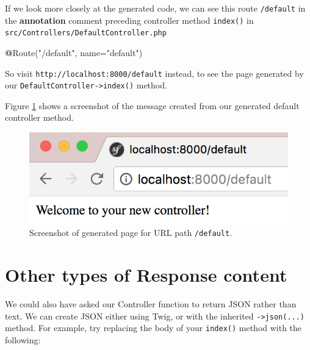\documentclass[a4paperpaper,openright]{book}
\newenvironment{Shaded}{}{}
\newcommand{\ErrorTok}[1]{\textcolor[rgb]{1.00,0.00,0.00}{\textbf{#1}}}
\newcommand{\KeywordTok}[1]{\textcolor[rgb]{0.00,0.44,0.13}{\textbf{#1}}}
\newcommand{\NormalTok}[1]{#1}
\newcommand{\OtherTok}[1]{\textcolor[rgb]{0.00,0.44,0.13}{#1}}
\newcommand{\StringTok}[1]{\textcolor[rgb]{0.25,0.44,0.63}{#1}}
\begin{document}
If we look more closely at the generated code, we can see this route
\texttt{/default} in the \textbf{annotation} comment preceding
controller method \texttt{index()} in
\texttt{src/Controllers/DefaultController.php}

\begin{Shaded}
\begin{Highlighting}[]
    \ErrorTok{@}\NormalTok{Route}\OtherTok{(}\StringTok{"/default"}\OtherTok{,}\NormalTok{ name=}\StringTok{"default"}\OtherTok{)}
\end{Highlighting}
\end{Shaded}

So visit \texttt{http://localhost:8000/default} instead, to see the page
generated by our \texttt{DefaultController-\textgreater{}index()}
method.

Figure \ref{generated_default} shows a screenshot of the message created
from our generated default controller method.

\begin{figure}
\centering
\includegraphics{./tex2pdf.-65f13e14688ab55b/1ed3d02a50a2750e79c73555fde09e2b4117bd0f.png}
\caption{Screenshot of generated page for URL path \texttt{/default}.
\label{generated_default}}
\end{figure}

\hypertarget{other-types-of-response-content}{%
\section{Other types of Response
content}\label{other-types-of-response-content}}

We could also have asked our Controller function to return JSON rather
than text. We can create JSON either using Twig, or with the inherited
\texttt{-\textgreater{}json(...)} method. For example, try replacing the
body of your \texttt{index()} method with the following:

\begin{Shaded}
\end{Shaded}
\end{document}
